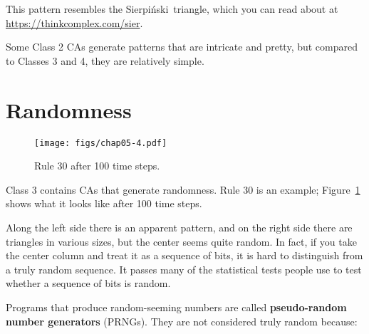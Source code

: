 \documentclass[12pt]{book}
\theoremstyle{exercise}
\newcommand{\py}{\verb}%}
\begin{document}

\newcommand{\Sierpinski}{Sierpi\'{n}ski}

This pattern resembles the \Sierpinski~triangle, which
you can read about at \url{https://thinkcomplex.com/sier}.


Some Class 2 CAs generate patterns that are intricate and
pretty, but compared to Classes 3 and 4, they are relatively
simple.


\section{Randomness}

\begin{figure}
\centerline{\texttt{[image: figs/chap05-4.pdf]}}
\caption{Rule 30 after 100 time steps.}
\label{chap05-4}
\end{figure}

Class 3 contains CAs that generate randomness.
Rule 30 is an example; Figure~\ref{chap05-4} shows what it looks like
after 100 time steps.


Along the left side there is an apparent pattern, and on the right
side there are triangles in various sizes, but the center seems
quite random.  In fact, if you take the center column and treat it as a
sequence of bits, it is hard to distinguish from a truly random
sequence.  It passes many of the statistical tests people use
to test whether a sequence of bits is random.

Programs that produce random-seeming numbers are called
{\bf pseudo-random number generators} (PRNGs).  They are not considered
truly random because:


\end{document}
